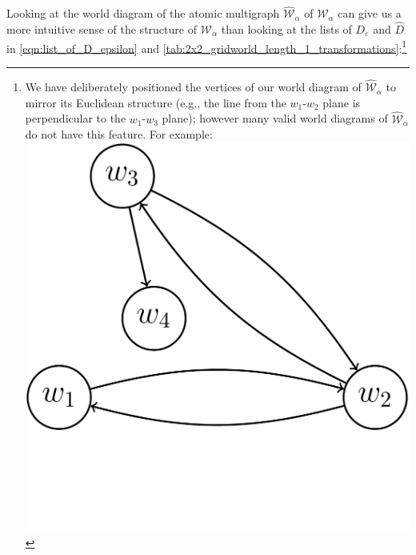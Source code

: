 Looking at the world diagram of the atomic multigraph $\hat{\mathscr{W}}_{\alpha}$ of $\mathscr{W}_{\alpha}$ can give us a more intuitive sense of the structure of $\mathscr{W}_{\alpha}$ than looking at the lists of $D_{\varepsilon}$ and $\hat{D}$ in \cref{eqn:list_of_D_epsilon} and \cref{tab:2x2_gridworld_length_1_transformations}:\footnote{
    We have deliberately positioned the vertices of our world diagram of $\hat{\mathscr{W}}_{\alpha}$ to mirror its Euclidean structure (e.g., the line from the $w_{1}$-$w_{2}$ plane is perpendicular to the $w_{1}$-$w_{3}$ plane); however many valid world diagrams of $\hat{\mathscr{W}}_{\alpha}$ do not have this feature.
    For example:
    \includegraphics[width=\linewidth]{2MathematicalFramework/Images/isomorphic_world_diagrams_2.png}
}

